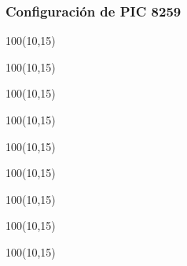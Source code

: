 \documentclass[aspectratio=169]{beamer}
\begin{document}
\begin{frame}
    \frametitle{Configuración de PIC 8259}
    \begin{textblock}{100}(10,15)  \end{textblock}
    \begin{textblock}{100}(10,15)  \end{textblock}
    \begin{textblock}{100}(10,15)  \end{textblock}
    \begin{textblock}{100}(10,15)  \end{textblock}
    \begin{textblock}{100}(10,15)  \end{textblock}
    \begin{textblock}{100}(10,15)  \end{textblock}
    \begin{textblock}{100}(10,15)  \end{textblock}
    \begin{textblock}{100}(10,15)  \end{textblock}
    \begin{textblock}{100}(10,15)  \end{textblock}
\end{frame}
\end{document}
